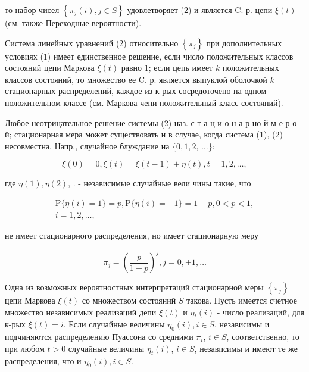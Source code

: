 \documentclass[10pt]{article}
\begin{document}
то набор чисел $\left\{\pi_{j}(i), j \in S\right\}$ удовлетворяет (2) и является C. р. цепи $\xi(t)$ (см. также Переходные вероятности).



Система линейных уравнений (2) относительно $\left\{\pi_{j}\right\}$ при дополнительных условиях (1) имеет единственное решение, если число положительных классов состояний цепи Маркова $\xi(t)$ равно 1; если цепь имеет $k$ положительных классов состояний, то множество ее C. р. является выпуклой оболочкой $k$ стационарных распределений, каждое из к-рых сосредоточено на одном положительном классе (см. Маркова чепи положительный класс состояний).



Любое неотрицательное решение системы (2) наз. с т а ц и о н а р но й м е р о й; стационарная мера может существовать и в случае, когда система (1), (2) несовместна. Напр., случайное блуждание на $\{0,1,2$, ...\}:



\[

\xi(0)=0, \xi(t)=\xi(t-1)+\eta(t), t=1,2, \ldots,

\]



где $\eta(1), \eta(2)$, . - независимые случайные вели чины такие, что



\[

\begin{gathered}

\mathrm{P}\{\eta(i)=1\}=p, \mathrm{P}\{\eta(i)=-1\}=1-p, 0<p<1, \\

i=1,2, \ldots,

\end{gathered}

\]



не имеет стационарного распределения, но имеет стационарную меру



\[

\pi_{j}=\left(\frac{p}{1-p}\right)^{j}, j=0, \pm 1, \ldots

\]



Одна из возможных вероятностных интерпретаций стационарной меры $\left\{\pi_{j}\right\}$ цепи Маркова $\xi(t)$ со множеством состояний $S$ такова. Пусть имеется счетное множество независимых реализаций депи $\xi(t)$ и $\eta_{t}(i)$ - число реализаций, для к-рых $\xi(t)=i$. Если случайные величины $\eta_{0}(i), i \in S$, независимы и подчиняются распределению Пуассона со средними $\pi_{i}$, $i \in S$, соответственно, то при любом $t>0$ случайные величины $\eta_{t}(i)$, $i \in S$, незавпсимы и имеют те же распределения, что и $\eta_{0}(i), i \in S$.
\end{document}
